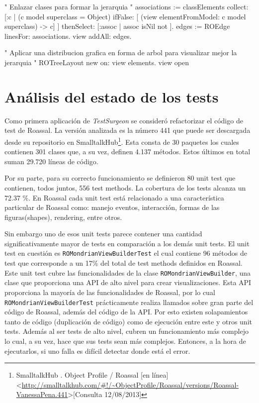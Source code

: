 \begin{code}
" Enlazar clases para formar la jerarquia "
associations := classElements collect: [:c |
	(c model superclass = Object)
		ifFalse: [ (view elementFromModel: c
		model superclass) -> c]
	] thenSelect: [:assoc | assoc isNil not ].
edges := ROEdge linesFor: associations.
view addAll: edges.

" Aplicar una distribucion grafica en forma de arbol para visualizar mejor la jerarquia "
ROTreeLayout new on: view elements.
view open

\end{code}


\section{Análisis del estado de los tests}

\par Como primera aplicación de \emph{TestSurgeon} se consideró refactorizar el código de test de Roassal. La versión analizada es la número 441 que puede ser descargada desde su repositorio en SmalltalkHub\footnote{SmalltalkHub . Object Profile / Roassal [en línea] \textless\url{http://smalltalkhub.com/\#!/~ObjectProfile/Roassal/versions/Roassal-VanessaPena.441}\textgreater [Consulta 12/08/2013] }. Esta consta de 30 paquetes los cuales contienen 301 clases que, a su vez, definen 4.137 métodos. Estos últimos en total suman 29.720 líneas de código.

\par Por su parte, para su correcto funcionamiento se definieron 80 unit test que contienen, todos juntos, 556 test methods. La cobertura de los tests alcanza un 72.37 \%.  En Roassal cada unit test está relacionado a una característica particular de Roassal como: manejo eventos, interacción, formas de las figuras(shapes), rendering, entre otros. 

\par Sin embargo uno de esos unit tests parece contener una cantidad significativamente mayor de tests en comparación a los demás unit tests.  El unit test en cuestión es {\tt ROMondrianViewBuilderTest} el cual contiene 96 métodos de test que corresponde a un 17\% del total de test methods definidos en Roassal. Este unit test cubre las funcionalidades de la clase {\tt ROMondrianViewBuilder}, una clase que proporciona una API de alto nivel para crear visualizaciones. Esta API proporciona la mayoría de las funcionalidades de Roassal, por lo cual {\tt ROMondrianViewBuilderTest} prácticamente realiza llamados sobre gran parte del código de Roassal, además del código de la API. Por esto existen solapamientos tanto de código (duplicación de código) como de ejecución entre este y otros unit tests. Además al ser tests de alto nivel, cubren un funcionamiento más complejo lo cual, a su vez, hace que sus tests sean más complejos. Entonces, a la hora de ejecutarlos, si uno falla es difícil detectar donde está el error.

